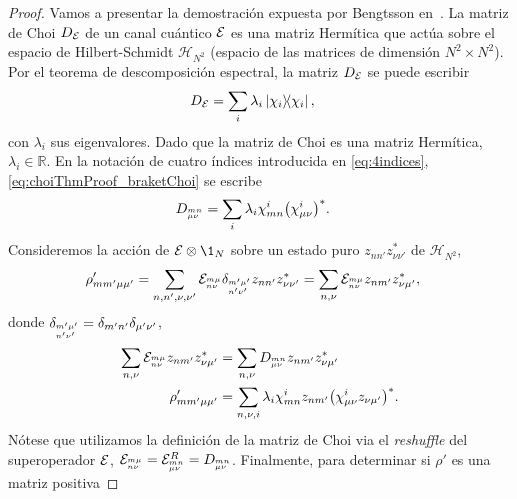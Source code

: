 \begin{proof}
Vamos a presentar la demostración expuesta por Bengtsson
en~\cite[p. 281]{bengtsson_zyczkowski_2017}.
La matriz de Choi $D_{\mathcal{E}}$ de un 
canal cuántico $\mathcal{E}$ es una matriz Hermítica que 
actúa sobre el espacio de Hilbert-Schmidt $\mathcal{H}_{N^2}$
(espacio de las matrices de dimensión $N^2\times N^2$). 
Por el teorema de descomposición espectral, 
la matriz $D_{\mathcal{E}}$ se puede escribir~\cite{nielsen_chuang_2011}
\begin{align}\label{eq:choiThmProof_braketChoi}
D_{\E}&=\sum_{i}\lambda_i\dyad{\chi_i}{\chi_i},
\end{align}
con $\lambda_i$ sus eigenvalores. Dado que la matriz de Choi es una 
matriz Hermítica, $\lambda_i\in\mathbb{R}$. En la notación 
de cuatro índices introducida en \eqref{eq:4indices},
\eqref{eq:choiThmProof_braketChoi} se escribe
\begin{align}
D_{{{}^{mn}_{\mu\nu}}}&=\sum_i\lambda_i
\chi^i_{mn}\qty(\chi_{\mu\nu}^i)^*.
\end{align}
Consideremos la acción de $\E\ot \1_N$ sobre un 
estado puro $z_{nn'}z^*_{\nu\nu'}$ de $\mathcal{H}_{N^2}$,
\begin{align}
\rho'_{mm'\mu\mu'}&=
\sum_{n,n',\nu,\nu'}
\mathcal{E}_{{{}^{m\mu}_{n\nu}}}\delta_{{{}^{m'\mu'}_{n'	\nu'}}}z_{nn'}z^*_{\nu\nu'}
=
\sum_{n,\nu}
\mathcal{E}_{{{}^{m\mu}_{n\nu}}}z_{nm'}z^*_{\nu\mu'},
\end{align}
donde $\delta_{{{}^{m'\mu'}_{n'	\nu'}}}=\delta_{m'n'}\delta_{\mu'\nu'}$,
\begin{align}
\sum_{n,\nu}\mathcal{E}_{{{}^{m\mu}_{n\nu}}}z_{nm'}z^*_{\nu\mu'}&=
\sum_{n,\nu}D_{{{}^{mn}_{\mu\nu}}}z_{nm'}z^*_{\nu\mu'}\nonumber\\
\rho'_{mm'\mu\mu'}&=
\sum_{n,\nu,i}\lambda_{i}
\chi^i_{mn}z_{nm'}\qty(\chi_{\mu\nu}^iz_{\nu\mu'})^*.
\label{eq:rho'_ChoiThmProof}
\end{align}
\here
Nótese que utilizamos la definición de la matriz de Choi via 
el \textit{reshuffle} del superoperador $\mathcal{E}$, 
$\mathcal{E}_{{{}^{m\mu}_{n\nu}}}=\mathcal{E}^R_{{{}^{mn}_{\mu\nu}}}
=D_{{{}^{mn}_{\mu\nu}}}$.
Finalmente, para determinar  si $\rho'$ es una matriz positiva 

\end{proof}
